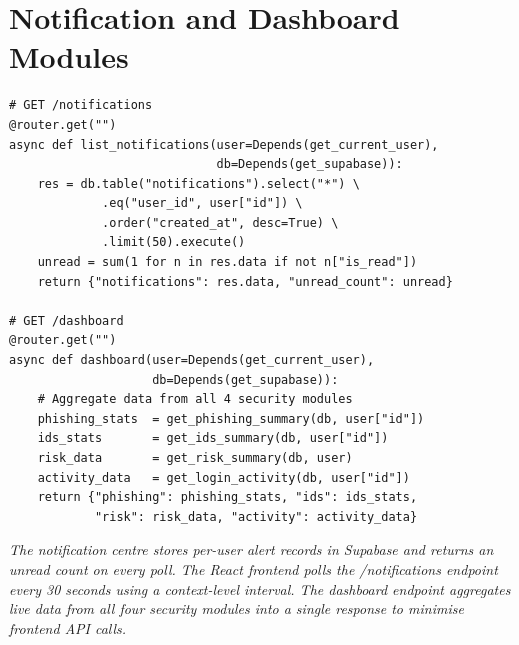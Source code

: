 \section{Notification and Dashboard Modules}
\begin{verbatim}
# GET /notifications
@router.get("")
async def list_notifications(user=Depends(get_current_user),
                             db=Depends(get_supabase)):
    res = db.table("notifications").select("*") \
             .eq("user_id", user["id"]) \
             .order("created_at", desc=True) \
             .limit(50).execute()
    unread = sum(1 for n in res.data if not n["is_read"])
    return {"notifications": res.data, "unread_count": unread}

# GET /dashboard
@router.get("")
async def dashboard(user=Depends(get_current_user),
                    db=Depends(get_supabase)):
    # Aggregate data from all 4 security modules
    phishing_stats  = get_phishing_summary(db, user["id"])
    ids_stats       = get_ids_summary(db, user["id"])
    risk_data       = get_risk_summary(db, user)
    activity_data   = get_login_activity(db, user["id"])
    return {"phishing": phishing_stats, "ids": ids_stats,
            "risk": risk_data, "activity": activity_data}
\end{verbatim}
\textit{The notification centre stores per-user alert records in Supabase and returns an unread count on every poll. The React frontend polls the /notifications endpoint every 30 seconds using a context-level interval. The dashboard endpoint aggregates live data from all four security modules into a single response to minimise frontend API calls.}
